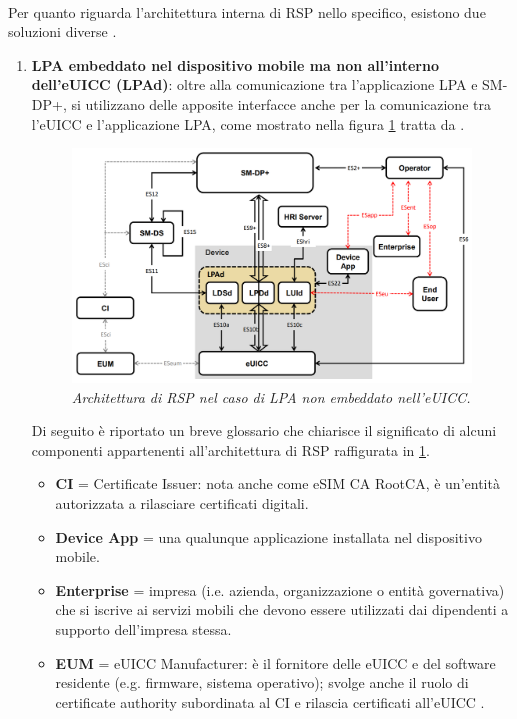 \documentclass[10pt, oneside]{book}
\begin{document}
\\Per quanto riguarda l'architettura interna di RSP nello specifico, esistono due soluzioni diverse \cite{GSMA-docs-new}.
\begin{enumerate}
\item \textbf{LPA embeddato nel dispositivo mobile ma non all'interno dell'eUICC (LPAd)}: oltre alla comunicazione tra l'applicazione LPA e SM-DP+, si utilizzano delle apposite interfacce anche per la comunicazione tra l'eUICC e l'applicazione LPA, come mostrato nella figura \ref{fig:RSP-LPAd} tratta da \cite{GSMA-docs-new}.
\begin{figure}
\includegraphics[width=\linewidth]{RSP-LPAd.png}
\caption{\textit{Architettura di RSP nel caso di LPA non embeddato nell'eUICC.}}
\label{fig:RSP-LPAd}
\end{figure}
Di seguito è riportato un breve glossario che chiarisce il significato di alcuni componenti appartenenti all'architettura di RSP raffigurata in \ref{fig:RSP-LPAd}.
\begin{itemize}
\item \textbf{CI} = Certificate Issuer: nota anche come eSIM CA RootCA, è un'entità autorizzata a rilasciare certificati digitali.
\item \textbf{Device App} = una qualunque applicazione installata nel dispositivo mobile.
\item \textbf{Enterprise} = impresa (i.e. azienda, organizzazione o entità governativa) che si iscrive ai servizi mobili che devono essere utilizzati dai dipendenti a supporto dell'impresa stessa.
\item \textbf{EUM} = eUICC Manufacturer: è il fornitore delle eUICC e del software residente (e.g. firmware, sistema operativo); svolge anche il ruolo di certificate authority subordinata al CI e rilascia certificati all'eUICC \cite{GSMA-docs-new}\cite{Sec-analysis}.

\end{itemize}
\end{enumerate}
\end{document}
